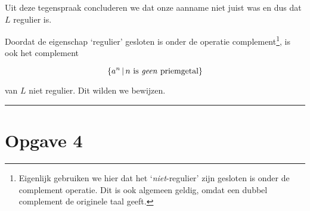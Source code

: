 \documentclass[a4paper,11pt]{article}
\begin{document}
Uit deze tegenspraak concluderen we dat onze aanname niet juist was en dus
dat $L$ regulier is.

Doordat de eigenschap `regulier' gesloten is onder de operatie
complement\footnote{Eigenlijk gebruiken we hier dat het `\emph{niet}-regulier'
zijn gesloten is onder de complement operatie. Dit is ook algemeen geldig,
omdat een dubbel complement de originele taal geeft.}, is ook het complement

\begin{displaymath}
\{a^{n} \, | \, n \mbox{ is \emph{geen} priemgetal}\}
\end{displaymath}

van $L$ niet regulier. Dit wilden we bewijzen.

\hfill\rule{2.1mm}{2.mm}


\section*{Opgave 4}
\end{document}
